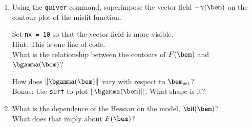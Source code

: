 \documentclass[11pt,titlepage,fleqn]{article}
\begin{document}
\begin{enumerate}
\vertgap

\item Using the \verb+quiver+ command, superimpose the vector field $-\gamma(\bem)$ on the contour plot of the misfit function.

Set \verb+nx = 10+ so that the vector field is more visible. \\
Hint: This is one line of code. \\
What is the relationship between the contours of $F(\bem)$ and $\bgamma(\bem)$?

\vertgap

How does $\|\bgamma(\bem)\|$ vary with respect to $\bem_{\rm est}$? \\
Bonus: Use \verb+surf+ to plot $\|\bgamma(\bem)\|$. What shape is it?

\vertgap

\item What is the dependence of the Hessian on the model, $\bH(\bem)$? \\
What does that imply about $F(\bem)$?


\end{enumerate}

\end{document}
